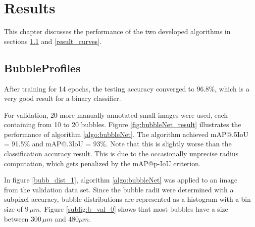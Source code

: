 \chapter{Results}\label{results}
	This chapter discusses the performance of the two developed algorithms in sections \ref{result_profiles} and \ref{result_curves}. 
	
		\section{BubbleProfiles}\label{result_profiles}
			
			After training for 14 epochs, the testing accuracy converged to 96.8\%, which is a very good result for a binary classifier. 

			For validation, 20 more manually annotated small images were used, each containing from 10 to 20 bubbles. Figure \ref{fig:bubbleNet_result} illustrates the performance of algorithm \ref{algo:bubbleNet}.  
			The algorithm achieved mAP@.5IoU = 91.5\% and mAP@.3IoU = 93\%. Note that this is slightly worse than the classification accuracy result. This is due to the occasionally unprecise radius computation, which gets penalized by the mAP@p-IoU criterion. 
			
			In figure \ref{bubb_dist_1}, algorithm \ref{algo:bubbleNet} was applied to an image from the validation data set. Since the bubble radii were determined with a subpixel accuracy, bubble distributions are represented as a histogram with a bin size of $9 \, \mu m$. Figure \ref{subfig:b_val_0} shows that most bubbles have a size between $300 \, \mu m$ and $480 \mu m$.
			
